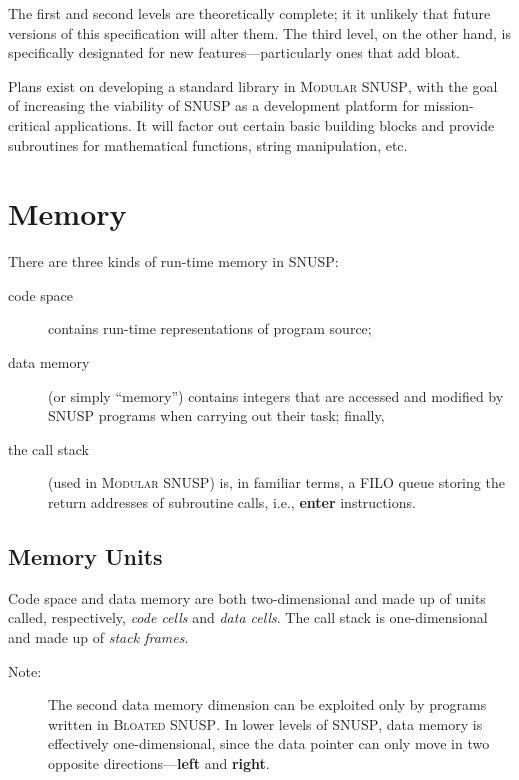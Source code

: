 \documentclass[a4paper]{article}
\newcommand\comment[2]{\begin{description} \item[#1] #2 \end{description}}
\newcommand\note[1]{\comment{Note:}{#1}}
\begin{document}
The first and second levels are theoretically complete; it it unlikely that
future versions of this specification will alter them.  The third level, on
the other hand, is specifically designated for new features---particularly
ones that add bloat.

Plans exist on developing a standard library in \textsc{Modular SNUSP}, with
the goal of increasing the viability of \textsc{SNUSP} as a development
platform for mission-critical applications.  It will factor out certain basic
building blocks and provide subroutines for mathematical functions, string
manipulation, etc.




\section{Memory}

There are three kinds of run-time memory in \textsc{SNUSP}:

\begin{description}

\item[code space] contains run-time representations of program source;

\item[data memory] (or simply ``memory'') contains integers that are
accessed and modified by \textsc{SNUSP} programs when carrying out their task;
finally,

\item[the call stack] (used in \textsc{Modular SNUSP}) is, in familiar terms,
a FILO queue storing the return addresses of subroutine calls, i.e.,
\textbf{enter} instructions.

\end{description}



\subsection{Memory Units}

Code space and data memory are both two-dimensional and made up of units
called, respectively, \emph{code cells} and \emph{data cells}.  The call stack
is one-dimensional and made up of \emph{stack frames}.

\note{The second data memory dimension can be exploited only by programs
written in \textsc{Bloated SNUSP}.  In lower levels of \textsc{SNUSP}, data
memory is effectively one-dimensional, since the data pointer can only move in
two opposite directions---\textbf{left} and \textbf{right}.}
\end{document}

